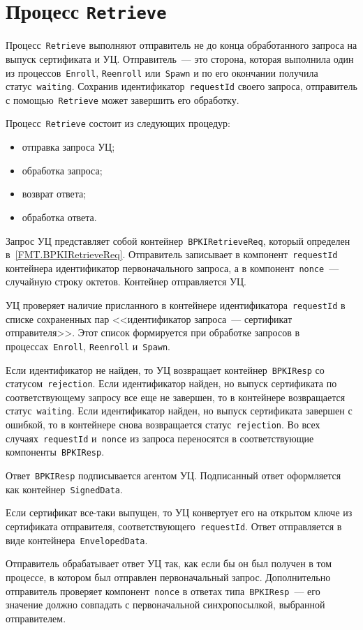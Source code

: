 \section{Процесс \texttt{Retrieve}}\label{PROCESSES.Retrieve}

Процесс~\texttt{Retrieve} выполняют отправитель не до конца обработанного
запроса на выпуск сертификата и УЦ.  Отправитель~--- это сторона, которая 
выполнила один из процессов~\texttt{Enroll}, \texttt{Reenroll} 
или~\texttt{Spawn} и по его окончании получила статус~\texttt{waiting}. 
Сохранив идентификатор~\texttt{requestId} своего запроса, отправитель с 
помощью~\texttt{Retrieve} может завершить его обработку.

Процесс~\texttt{Retrieve} состоит из следующих процедур:
\begin{itemize}
\item
отправка запроса УЦ;
\item
обработка запроса;
\item
возврат ответа;
\item
обработка ответа.
\end{itemize}

Запрос УЦ представляет собой контейнер~\texttt{BPKIRetrieveReq},
который определен в~\ref{FMT.BPKIRetrieveReq}.
Отправитель записывает в компонент~\texttt{requestId} контейнера
идентификатор первоначального запроса, а в компонент~\texttt{nonce}~---
случайную строку октетов. Контейнер отправляется УЦ.

УЦ проверяет наличие присланного в контейнере идентификатора~\texttt{requestId} 
в списке сохраненных пар <<идентификатор запроса~--- сертификат отправителя>>. 
Этот список формируется при обработке запросов в процессах~\texttt{Enroll}, 
\texttt{Reenroll} и~\texttt{Spawn}. 

Если идентификатор не найден, то УЦ возвращает контейнер~\texttt{BPKIResp}
со статусом~\texttt{rejection}. 
%
Если идентификатор найден, но выпуск сертификата по соответствующему 
запросу все еще не завершен, то в контейнере возвращается 
статус~\texttt{waiting}.  
%
Если идентификатор найден, но выпуск сертификата завершен с ошибкой,
то в контейнере снова возвращается статус~\texttt{rejection}. 
%
Во всех случаях~\texttt{requestId} и~\texttt{nonce} из запроса переносятся 
в соответствующие компоненты~\texttt{BPKIResp}. 

Ответ~\texttt{BPKIResp} подписывается агентом УЦ. 
Подписанный ответ оформляется как контейнер~\texttt{SignedData}.

Если сертификат все-таки выпущен, то УЦ конвертует его 
на открытом ключе из сертификата отправителя, 
соответствующего~\texttt{requestId}. Ответ отправляется
в виде контейнера~\texttt{EnvelopedData}.

Отправитель обрабатывает ответ УЦ так, как если бы он был получен в 
том процессе, в котором был отправлен первоначальный запрос.
Дополнительно отправитель проверяет компонент~\texttt{nonce}
в ответах типа~\texttt{BPKIResp}~--- его значение должно совпадать 
с первоначальной синхропосылкой, выбранной отправителем.


